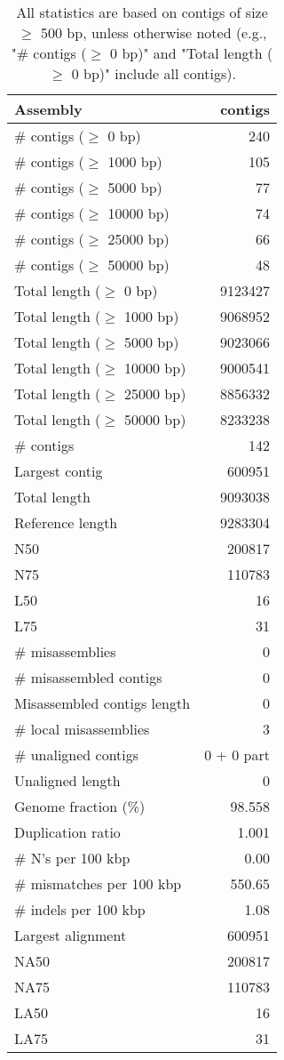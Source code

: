 \documentclass[12pt,a4paper]{article}
\begin{document}
\begin{table}[ht]
\begin{center}
\caption{All statistics are based on contigs of size $\geq$ 500 bp, unless otherwise noted (e.g., "\# contigs ($\geq$ 0 bp)" and "Total length ($\geq$ 0 bp)" include all contigs).}
\begin{tabular}{|l*{1}{|r}|}
\hline
Assembly & contigs \\ \hline
\# contigs ($\geq$ 0 bp) & 240 \\ \hline
\# contigs ($\geq$ 1000 bp) & 105 \\ \hline
\# contigs ($\geq$ 5000 bp) & 77 \\ \hline
\# contigs ($\geq$ 10000 bp) & 74 \\ \hline
\# contigs ($\geq$ 25000 bp) & 66 \\ \hline
\# contigs ($\geq$ 50000 bp) & 48 \\ \hline
Total length ($\geq$ 0 bp) & 9123427 \\ \hline
Total length ($\geq$ 1000 bp) & 9068952 \\ \hline
Total length ($\geq$ 5000 bp) & 9023066 \\ \hline
Total length ($\geq$ 10000 bp) & 9000541 \\ \hline
Total length ($\geq$ 25000 bp) & 8856332 \\ \hline
Total length ($\geq$ 50000 bp) & 8233238 \\ \hline
\# contigs & 142 \\ \hline
Largest contig & 600951 \\ \hline
Total length & 9093038 \\ \hline
Reference length & 9283304 \\ \hline
N50 & 200817 \\ \hline
N75 & 110783 \\ \hline
L50 & 16 \\ \hline
L75 & 31 \\ \hline
\# misassemblies & 0 \\ \hline
\# misassembled contigs & 0 \\ \hline
Misassembled contigs length & 0 \\ \hline
\# local misassemblies & 3 \\ \hline
\# unaligned contigs & 0 + 0 part \\ \hline
Unaligned length & 0 \\ \hline
Genome fraction (\%) & 98.558 \\ \hline
Duplication ratio & 1.001 \\ \hline
\# N's per 100 kbp & 0.00 \\ \hline
\# mismatches per 100 kbp & 550.65 \\ \hline
\# indels per 100 kbp & 1.08 \\ \hline
Largest alignment & 600951 \\ \hline
NA50 & 200817 \\ \hline
NA75 & 110783 \\ \hline
LA50 & 16 \\ \hline
LA75 & 31 \\ \hline
\end{tabular}
\end{center}
\end{table}
\end{document}
